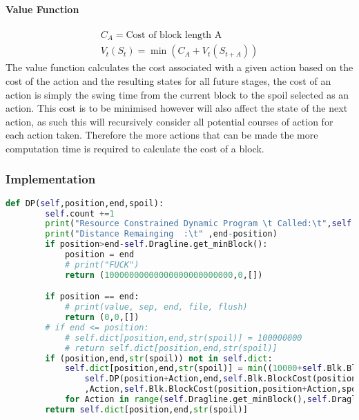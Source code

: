 \paragraph*{Value Function}
\begin{align}
\label{value}
C_A = \text{Cost of block length A}\\
V_t(S_t) = \min (C_A+V_t(S_{t+A}))
\end{align}
The value function calculates the cost associated with a given action based on the cost of the action and the resulting states for all future stages, the cost of an action is simply the swing time from the current block to the spoil selected as an action. This cost is to be minimised however will also affect the state of the next action, as such this will recursively consider all potential courses of action for each action taken. Therefore the more actions that can be made the more computation time is required to calculate the cost of a block. 
\subsubsection{Implementation}
\begin{lstlisting}[language = python]
	def DP(self,position,end,spoil):
		self.count +=1
		print("Resource Constrained Dynamic Program \t Called:\t",self.count,'  times')
		print("Distance Remainging  :\t" ,end-position)
		if position>end-self.Dragline.get_minBlock():
			position = end
			# print("FUCK")
			return (10000000000000000000000000,0,[])

		if position == end:
			# print(value, sep, end, file, flush)
			return (0,0,[])
		# if end <= position:
			# self.dict[position,end,str(spoil)] = 100000000
			# return self.dict[position,end,str(spoil)]
		if (position,end,str(spoil)) not in self.dict:
			self.dict[position,end,str(spoil)] = min((10000+self.Blk.BlockCost(position,position+Action,spoil)[0]+
				self.DP(position+Action,end,self.Blk.BlockCost(position,position+Action,spoil)[1])[0]
				,Action,self.Blk.BlockCost(position,position+Action,spoil)[1])
			for Action in range(self.Dragline.get_minBlock(),self.Dragline.get_maxBlock()))
		return self.dict[position,end,str(spoil)]

\end{lstlisting}
